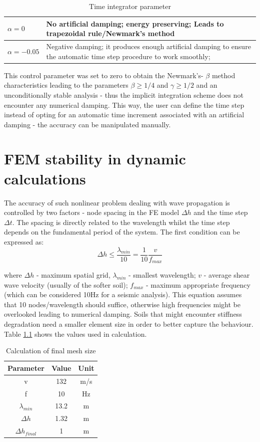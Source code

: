 \documentclass[10pt,a4paper]{report}
\begin{document}
\begin{table}[h!]
	\centering
	\begin{tabular}{|p{2cm}|p{10cm}|}
		\hline $\alpha=0$       &      No artificial damping; energy preserving;
		Leads to trapezoidal rule/Newmark's method \\
		\hline $\alpha=-0.05$ & Negative damping; it produces enough artificial damping to ensure the automatic time step procedure to work smoothly; \\
		\hline
	\end{tabular}
	\caption{Time integrator parameter}
\end{table}

This control parameter was set to zero to obtain the Newmark's- $\beta$ method characteristics leading to the parameters $\beta≥1/4$ and $\gamma ≥1/2$ and an unconditionally stable analysis - thus the implicit integration scheme does not encounter any numerical damping. This way, the user can define the time step instead of opting for an automatic time increment associated with an artificial damping - the accuracy can be manipulated manually.

\newpage
\chapter{FEM stability in dynamic calculations} \label{App:AppendixI}
The accuracy of such nonlinear problem dealing with wave propagation is controlled by two factors - node spacing in the FE model $\Delta h$ and the time step $\Delta t$. The spacing is directly related to the wavelength whilst the time step depends on the fundamental period of the system. 
The first condition can be expressed as:
\begin{equation}
\Delta h\leq\frac{\lambda_{min}}{10}=\frac{1}{10} \frac{v}{f_{max}}
\end{equation}

where $\Delta h$ - maximum spatial grid, $\lambda_{min}$ - smallest wavelength; $v$ - average shear wave velocity (usually of the softer soil); $f_{max}$ - maximum appropriate frequency (which can be considered 10Hz for a seismic analysis). This equation assumes that 10 nodes/wavelength should suffice, otherwise high frequencies might be overlooked leading to numerical damping. Soils that might encounter stiffness degradation need a smaller element size in order to better capture the behaviour. Table \ref{table:Deltah} shows the values used in calculation.

\begin{table}[h!]
	\centering
	\begin{tabular}{|c|c|c|}
		\hline Parameter      &     Value  & Unit  \\
		\hline v      &      132  & m/s  \\
		\hline f & 10 & Hz \\
		\hline $\lambda_{min} $ & 13.2 & m\\
		\hline $\Delta h$ & 1.32 & m \\
		\hline $\Delta h_{final}$ & 1 & m \\
		\hline
	\end{tabular}
	\caption{Calculation of final mesh size}
	\label{table:Deltah}
\end{table}
\end{document}
